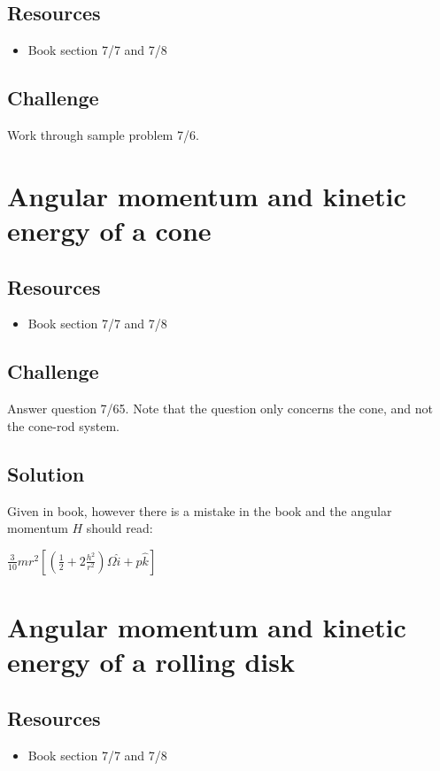 \subsection*{Resources}
\begin{itemize}
    \item Book section 7/7 and 7/8
\end{itemize}

\subsection*{Challenge}
Work through sample problem 7/6.




\newpage
\section{Angular momentum and kinetic energy of a cone}

\subsection*{Resources}
\begin{itemize}
    \item Book section 7/7 and 7/8
\end{itemize}

\subsection*{Challenge}
Answer question 7/65. Note that the question only concerns the cone, and not the cone-rod system.

\subsection*{Solution}
Given in book, however there is a mistake in the book and the angular momentum $H$ should read:

$\displaystyle
\frac{3}{10} m r^2 \left[ \left(\frac{1}{2} + 2 \frac{h^2}{r^2} \right) \Omega \hat{i} + p \hat{k} \right]
$




\newpage
\section{Angular momentum and kinetic energy of a rolling disk}

\subsection*{Resources}
\begin{itemize}
    \item Book section 7/7 and 7/8
\end{itemize}

